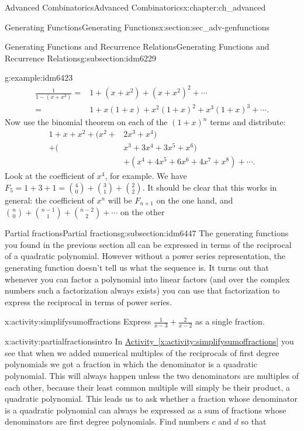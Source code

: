 \documentclass[oneside,10pt,]{book}
\numberwithin{equation}{chapter}
\newcommand{\amp}{&}
\begin{document}
\begin{chapterptx}{Advanced Combinatorics}{}{Advanced Combinatorics}{}{}{x:chapter:ch_advanced}
\begin{sectionptx}{Generating Functions}{}{Generating Functions}{}{}{x:section:sec_adv-genfunctions}
\begin{subsectionptx}{Generating Functions and Recurrence Relations}{}{Generating Functions and Recurrence Relations}{}{}{g:subsection:idm6229}
\begin{example}{}{g:example:idm6423}
\begin{align*}
\frac{1}{1-(x+x^2)} = \amp 1 + (x+x^2) + (x+x^2)^2 + \cdots \\
= \amp 1 + x(1+x) + x^2(1+x)^2 + x^3(1+x)^3 + \cdots\text{.}
\end{align*}
Now use the binomial theorem on each of the \((1+x)^n\) terms and distribute:%
\begin{align*}
1 + x + x^2 + (x^2 +\amp 2x^3 + x^4)\\
+ (\amp x^3 + 3x^4 + 3x^5 + x^6)\\
\amp + (x^4 + 4x^5 + 6x^6 + 4x^7 + x^8) + \cdots \text{.}
\end{align*}
Look at the coefficient of \(x^4\), for example.  We have \(F_5 = 1 + 3 + 1 = \binom{4}{0} + \binom{3}{1} + \binom{2}{2}\).  It should be clear that this works in general: the coefficient of \(x^n\) will be \(F_{n+1}\) on the one hand, and \(\binom{n}{0} + \binom{n-1}{1} + \binom{n-2}{2}+ \cdots\) on the other%
\end{example}
\end{subsectionptx}
%
%
\typeout{************************************************}
\typeout{************************************************}
%
\begin{subsectionptx}{Partial fractions}{}{Partial fractions}{}{}{g:subsection:idm6447}
The generating functions you found in the previous section all can be expressed in terms of the reciprocal of a quadratic polynomial. However without a power series representation, the generating function doesn't tell us what the sequence is. It turns out that whenever you can factor a polynomial into linear factors (and over the complex numbers such a factorization always exists) you can use that factorization to express the reciprocal in terms of power series.%
\begin{activity}{}{x:activity:simplifysumoffractions}%
Express \(\frac{1}{x-3} + \frac{2}{x-2}\) as a single fraction.%
\end{activity}
\begin{activity}{}{x:activity:partialfractionsintro}%
In \hyperref[x:activity:simplifysumoffractions]{Activity~\ref{x:activity:simplifysumoffractions}} you see that when we added numerical multiples of the reciprocals of first degree polynomials we got a fraction in which the denominator is a quadratic polynomial. This will always happen unless the two denominators are multiples of each other, because their least common multiple will simply be their product, a quadratic polynomial. This leads us to ask whether a fraction whose denominator is a quadratic polynomial can always be expressed as a sum of fractions whose denominators are first degree polynomials. Find numbers \(c\) and \(d\) so that%

\end{activity}
\end{subsectionptx}
\end{sectionptx}
\end{chapterptx}
\end{document}
